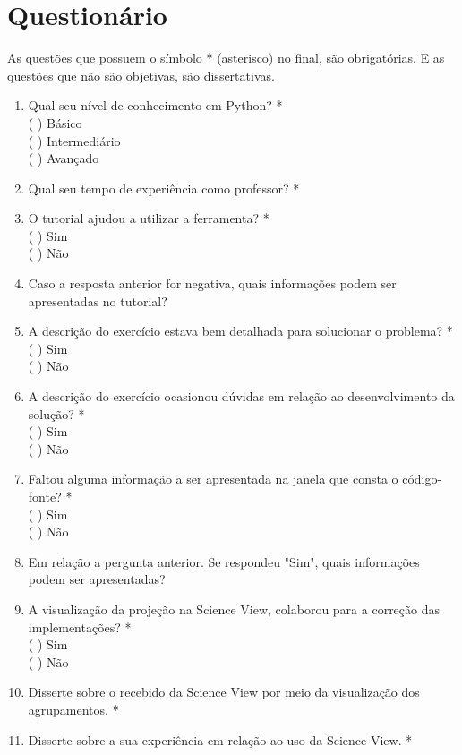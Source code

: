 \chapter{Questionário}
\label{apendice:questionario}


	As questões que possuem o símbolo * (asterisco) no final, são obrigatórias. E
	as questões que não são objetivas, são dissertativas.

\begin{enumerate}
	\item Qual seu nível de conhecimento em Python? *\\
	(  ) Básico\\
	(  ) Intermediário\\
	(  ) Avançado
	 	
	\item Qual seu tempo de experiência como professor? *
	
	\item O tutorial ajudou a utilizar a ferramenta? *\\
	(  ) Sim\\
	(  ) Não\\
	
	\item Caso a resposta anterior for negativa, quais informações podem ser apresentadas no tutorial?
	
	\item A descrição do exercício estava bem detalhada para solucionar o problema? *\\
	(  ) Sim\\
	(  ) Não\\
	
	\item A descrição do exercício ocasionou dúvidas em relação ao desenvolvimento da solução? *\\
	(  ) Sim\\
	(  ) Não\\
	
	\item Faltou alguma informação a ser apresentada na janela que consta o código-fonte? *\\
	(  ) Sim\\
	(  ) Não\\
	
	\item Em relação a pergunta anterior. Se respondeu "Sim", quais informações podem ser apresentadas?
	
	\item A visualização da projeção na Science View, colaborou para a correção das implementações? *\\
	(  ) Sim\\
	(  ) Não\\
	
	\item Disserte sobre o  recebido da Science View por meio da visualização dos agrupamentos. *
	
	\item Disserte sobre a sua experiência em relação ao uso da Science View. *
	
\end{enumerate}